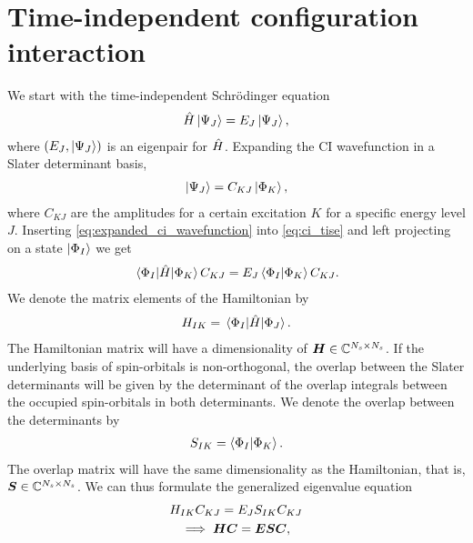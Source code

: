    \section{Time-independent configuration interaction}
        We start with the time-independent Schrödinger equation
        \begin{align}
            \hat{H}\ket{\Psi_J} = E_J\ket{\Psi_J},
            \label{eq:ci_tise}
        \end{align}
        where $(E_J, \ket{\Psi_J})$ is an eigenpair for $\hat{H}$.
        Expanding the CI wavefunction in a Slater determinant basis,
        \begin{align}
            \ket{\Psi_J} = C_{KJ}\ket{\Phi_K},
            \label{eq:expanded_ci_wavefunction}
        \end{align}
        where $C_{KJ}$ are the amplitudes for a certain excitation $K$ for a
        specific energy level $J$.
        Inserting \autoref{eq:expanded_ci_wavefunction} into
        \autoref{eq:ci_tise} and left projecting on a state $\ket{\Phi_I}$ we
        get
        \begin{align}
            \mel{\Phi_I}{\hat{H}}{\Phi_K}C_{KJ}
            = E_J\braket{\Phi_I}{\Phi_K}C_{KJ}.
        \end{align}
        We denote the matrix elements of the Hamiltonian by
        \begin{align}
            H_{IK}
            = \mel{\Phi_I}{\hat{H}}{\Phi_J}.
        \end{align}
        The Hamiltonian matrix will have a dimensionality of $\boldsymbol{H} \in
        \mathbb{C}^{N_s \times N_s}$.
        If the underlying basis of spin-orbitals is non-orthogonal, the overlap
        between the Slater determinants will be given by the determinant of the
        overlap integrals between the occupied spin-orbitals in both
        determinants.
        We denote the overlap between the determinants by
        \begin{align}
            S_{IK} = \braket{\Phi_I}{\Phi_K}.
        \end{align}
        The overlap matrix will have the same dimensionality as the Hamiltonian,
        that is, $\boldsymbol{S} \in \mathbb{C}^{N_s \times N_s}$.
        We can thus formulate the generalized eigenvalue equation
        \begin{gather}
            H_{IK}C_{KJ} = E_J S_{IK}C_{KJ}
            \\
            \implies
            \boldsymbol{H} \boldsymbol{C} = \boldsymbol{E} \boldsymbol{S} \boldsymbol{C},
        \end{gather}
